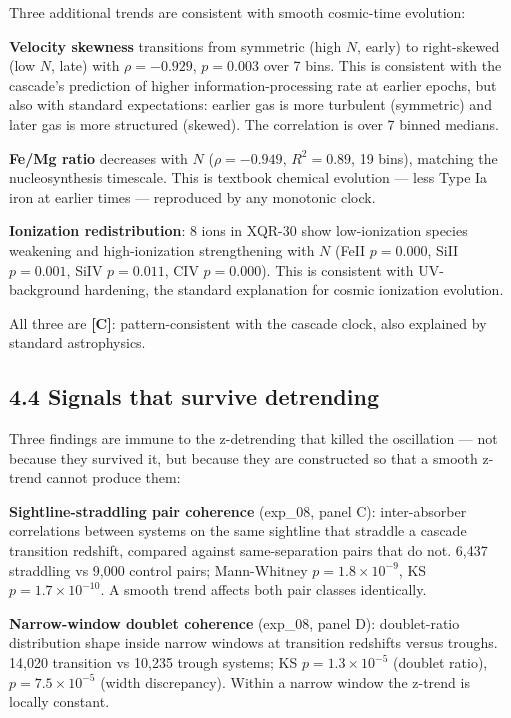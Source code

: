 \documentclass[11pt,a4paper]{article}
\begin{document}
Three additional trends are consistent with smooth cosmic-time evolution:

\textbf{Velocity skewness} transitions from symmetric (high $N$, early) to right-skewed (low $N$, late) with $\rho = -0.929$, $p = 0.003$ over 7 bins. This is consistent with the cascade's prediction of higher information-processing rate at earlier epochs, but also with standard expectations: earlier gas is more turbulent (symmetric) and later gas is more structured (skewed). The correlation is over 7 binned medians.

\textbf{Fe/Mg ratio} decreases with $N$ ($\rho = -0.949$, $R^2 = 0.89$, 19 bins), matching the nucleosynthesis timescale. This is textbook chemical evolution — less Type Ia iron at earlier times — reproduced by any monotonic clock.

\textbf{Ionization redistribution}: 8 ions in XQR-30 show low-ionization species weakening and high-ionization strengthening with $N$ (FeII $p = 0.000$, SiII $p = 0.001$, SiIV $p = 0.011$, CIV $p = 0.000$). This is consistent with UV-background hardening, the standard explanation for cosmic ionization evolution.

All three are \textbf{[C]}: pattern-consistent with the cascade clock, also explained by standard astrophysics.

\subsection*{4.4 Signals that survive detrending}

Three findings are immune to the z-detrending that killed the oscillation — not because they survived it, but because they are constructed so that a smooth z-trend cannot produce them:

\textbf{Sightline-straddling pair coherence} (exp\_08, panel C): inter-absorber correlations between systems on the same sightline that straddle a cascade transition redshift, compared against same-separation pairs that do not. 6,437 straddling vs 9,000 control pairs; Mann-Whitney $p = 1.8 \times 10^{-9}$, KS $p = 1.7 \times 10^{-10}$. A smooth trend affects both pair classes identically.

\textbf{Narrow-window doublet coherence} (exp\_08, panel D): doublet-ratio distribution shape inside narrow windows at transition redshifts versus troughs. 14,020 transition vs 10,235 trough systems; KS $p = 1.3 \times 10^{-5}$ (doublet ratio), $p = 7.5 \times 10^{-5}$ (width discrepancy). Within a narrow window the z-trend is locally constant.
\end{document}
